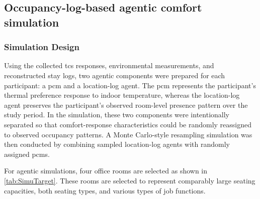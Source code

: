 \subsection{Occupancy-log-based agentic comfort simulation}
\subsubsection{Simulation Design}
Using the collected \ac{tcs} responses, environmental measurements, and reconstructed stay logs, two agentic components were prepared for each participant: a \ac{pcm} and a location-log agent.
The \ac{pcm} represents the participant's thermal preference response to indoor temperature, whereas the location-log agent preserves the participant's observed room-level presence pattern over the study period.
In the simulation, these two components were intentionally separated so that comfort-response characteristics could be randomly reassigned to observed occupancy patterns.
A Monte Carlo-style resampling simulation was then conducted by combining sampled location-log agents with randomly assigned \acp{pcm}.

For agentic simulations, four office rooms are selected as shown in \autoref{tab:SimuTarget}.
These rooms are selected to represent comparably large seating capacities, both seating types, and various types of job functions.
\begin{table}[pos=htbp!]
    \centering
    \small
    \caption{Target rooms used for field data collection and simulation cases}
    
    \label{tab:SimuTarget}
\end{table}

